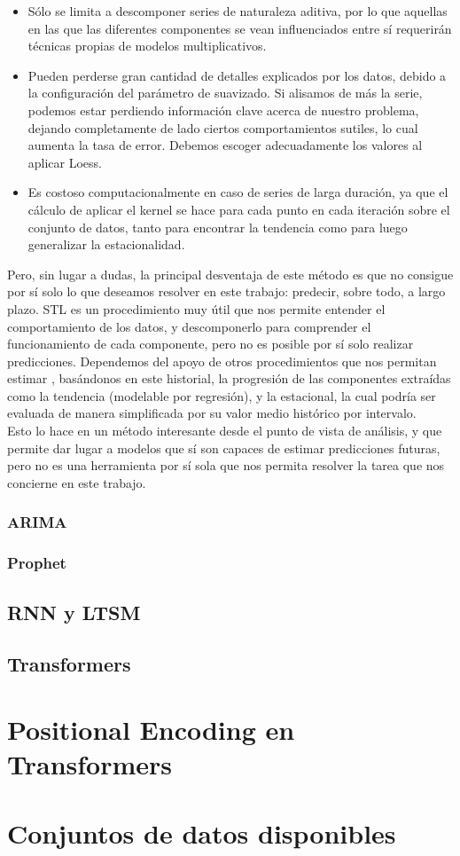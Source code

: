 \begin{itemize}
	\item Sólo se limita a descomponer series de naturaleza aditiva, por lo que aquellas en las que las diferentes componentes se vean influenciados entre sí requerirán técnicas propias de modelos multiplicativos.
	\item Pueden perderse gran cantidad de detalles explicados por los datos, debido a la configuración del parámetro de suavizado. Si alisamos de más la serie, podemos estar perdiendo información clave acerca de nuestro problema, dejando completamente de lado ciertos comportamientos sutiles, lo cual aumenta la tasa de error. Debemos escoger adecuadamente los valores al aplicar Loess.
	\item Es costoso computacionalmente en caso de series de larga duración, ya que el cálculo de aplicar el kernel se hace para cada punto en cada iteración sobre el conjunto de datos, tanto para encontrar la tendencia como para luego generalizar la estacionalidad.
\end{itemize}

Pero, sin lugar a dudas, la principal desventaja de este método es que no consigue por sí solo lo que deseamos resolver en este trabajo: predecir, sobre todo, a largo plazo. STL es un procedimiento muy útil que nos permite entender el comportamiento de los datos, y descomponerlo para comprender el funcionamiento de cada componente, pero no es posible por sí solo realizar predicciones. Dependemos del apoyo de otros procedimientos que nos permitan estimar , basándonos en este historial, la progresión de las componentes extraídas como la tendencia (modelable por regresión), y la estacional, la cual podría ser evaluada de manera simplificada por su valor medio histórico por intervalo.\\

Esto lo hace en un método interesante desde el punto de vista de análisis, y que permite dar lugar a modelos que sí son capaces de estimar predicciones futuras, pero no es una herramienta por sí sola que nos permita resolver la tarea que nos concierne en este trabajo.





\subsubsection{ARIMA}
\subsubsection{Prophet}

\subsection{RNN y LTSM}
\subsection{Transformers}

\section{Positional Encoding en Transformers}

\section{Conjuntos de datos disponibles}
